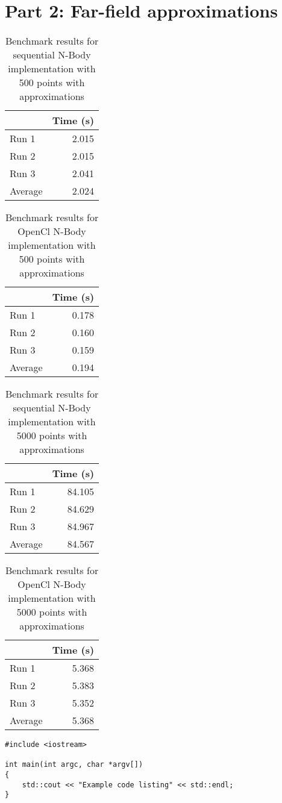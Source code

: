 \documentclass[12pt]{article}
\begin{document}
\section*{Part 2: Far-field approximations}

\begin{table}[H]
  \centering
  \begin{tabular}{lr}
    & {\bf Time (s)} \\
    \hline
    Run 1 & 2.015 \\
    Run 2 & 2.015 \\
    Run 3 & 2.041 \\
    \hline
    Average & 2.024
  \end{tabular}
  \caption{Benchmark results for sequential N-Body implementation with 500 points with approximations}
  \label{tbl-nbody-seq-500-approx}
\end{table}

\begin{table}[H]
  \centering
  \begin{tabular}{lr}
    & {\bf Time (s)} \\
    \hline
    Run 1 & 0.178 \\
    Run 2 & 0.160 \\
    Run 3 & 0.159 \\
    \hline
    Average & 0.194
  \end{tabular}
  \caption{Benchmark results for OpenCl N-Body implementation with 500 points with approximations}
  \label{tbl-nbody-gpu-500-approx}
\end{table}

\begin{table}[H]
  \centering
  \begin{tabular}{lr}
    & {\bf Time (s)} \\
    \hline
    Run 1 & 84.105 \\
    Run 2 & 84.629 \\
    Run 3 & 84.967 \\
    \hline
    Average & 84.567
  \end{tabular}
  \caption{Benchmark results for sequential N-Body implementation with 5000 points with approximations}
  \label{tbl-nbody-seq-5000-approx}
\end{table}

\begin{table}[H]
  \centering
  \begin{tabular}{lr}
    & {\bf Time (s)} \\
    \hline
    Run 1 & 5.368 \\
    Run 2 & 5.383 \\
    Run 3 & 5.352 \\
    \hline
    Average & 5.368
  \end{tabular}
  \caption{Benchmark results for OpenCl N-Body implementation with 5000 points with approximations}
  \label{tbl-nbody-gpu-5000-approx}
\end{table}



\begin{lstlisting}
#include <iostream>

int main(int argc, char *argv[])
{
    std::cout << "Example code listing" << std::endl;
}
\end{lstlisting}
\end{document}
